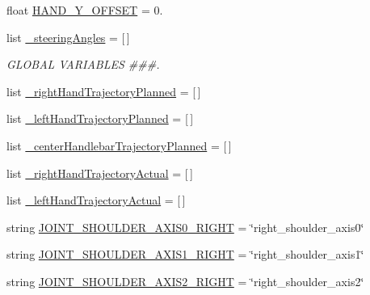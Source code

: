 \begin{DoxyCompactItemize}
\item 
float \mbox{\hyperlink{namespacesteering__trajectory__following__test_a6e8e6313b3c00feb6adb4a97e50117a2}{H\+A\+N\+D\+\_\+\+Y\+\_\+\+O\+F\+F\+S\+ET}} = 0.
\item 
list \mbox{\hyperlink{namespacesteering__trajectory__following__test_a2d977c9a658e4af1d3f3d1c275b29952}{\+\_\+steering\+Angles}} = \mbox{[}$\,$\mbox{]}
\begin{DoxyCompactList}\small\item\em G\+L\+O\+B\+AL V\+A\+R\+I\+A\+B\+L\+ES \#\#\#. \end{DoxyCompactList}\item 
list \mbox{\hyperlink{namespacesteering__trajectory__following__test_ab63e69afbc3c8869330bba2b5fe075b4}{\+\_\+right\+Hand\+Trajectory\+Planned}} = \mbox{[}$\,$\mbox{]}
\item 
list \mbox{\hyperlink{namespacesteering__trajectory__following__test_ae417a72c7e362028fbdac218f3f4b303}{\+\_\+left\+Hand\+Trajectory\+Planned}} = \mbox{[}$\,$\mbox{]}
\item 
list \mbox{\hyperlink{namespacesteering__trajectory__following__test_a11d89f8a08631c2b1e7d499fecbb33ed}{\+\_\+center\+Handlebar\+Trajectory\+Planned}} = \mbox{[}$\,$\mbox{]}
\item 
list \mbox{\hyperlink{namespacesteering__trajectory__following__test_ac6de0716852e9f87218ab1cdba0c4ba9}{\+\_\+right\+Hand\+Trajectory\+Actual}} = \mbox{[}$\,$\mbox{]}
\item 
list \mbox{\hyperlink{namespacesteering__trajectory__following__test_a8f516e8d2977b7f47327a25e57e67693}{\+\_\+left\+Hand\+Trajectory\+Actual}} = \mbox{[}$\,$\mbox{]}
\item 
string \mbox{\hyperlink{namespacesteering__trajectory__following__test_aff54edc18c0f74b3a4ce2d52a39ff4ce}{J\+O\+I\+N\+T\+\_\+\+S\+H\+O\+U\+L\+D\+E\+R\+\_\+\+A\+X\+I\+S0\+\_\+\+R\+I\+G\+HT}} = \char`\"{}right\+\_\+shoulder\+\_\+axis0\char`\"{}
\item 
string \mbox{\hyperlink{namespacesteering__trajectory__following__test_a9a40d67e3e6febc4c75cf55b3b8a7440}{J\+O\+I\+N\+T\+\_\+\+S\+H\+O\+U\+L\+D\+E\+R\+\_\+\+A\+X\+I\+S1\+\_\+\+R\+I\+G\+HT}} = \char`\"{}right\+\_\+shoulder\+\_\+axis1\char`\"{}
\item 
string \mbox{\hyperlink{namespacesteering__trajectory__following__test_acf310dab770cd8f3e7f0409bafdbfb80}{J\+O\+I\+N\+T\+\_\+\+S\+H\+O\+U\+L\+D\+E\+R\+\_\+\+A\+X\+I\+S2\+\_\+\+R\+I\+G\+HT}} = \char`\"{}right\+\_\+shoulder\+\_\+axis2\char`\"{}
\item 

\end{DoxyCompactItemize}
